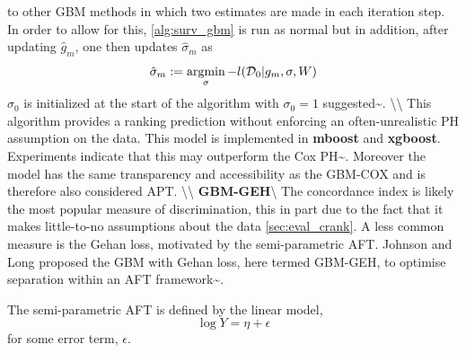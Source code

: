 \documentclass[
  letterpaper,
]{scrbook}
\theoremstyle{plain}
\theoremstyle{definition}
\theoremstyle{remark}
\begin{document}
to other GBM methods in which two estimates are made in each iteration
step. In order to allow for this, \ref{alg:surv_gbm} is run as normal
but in addition, after updating \(\hat{g}_m\), one then updates
\(\hat{\sigma}_m\) as \[
\hat{\sigma}_m := \operatornamewithlimits{argmin}_\sigma -l(\mathcal{D}_0|g_m,\sigma, W)
\] \(\sigma_0\) is initialized at the start of the algorithm with
\(\sigma_0 = 1\) suggested\textasciitilde{}\cite{Schmid2008b}.
\textbackslash\textbackslash{} This algorithm provides a ranking
prediction without enforcing an often-unrealistic PH assumption on the
data. This model is implemented in \textbf{mboost} and \textbf{xgboost}.
Experiments indicate that this may outperform the Cox
PH\textasciitilde{}\cite{Schmid2008b}. Moreover the model has the same
transparency and accessibility as the GBM-COX and is therefore also
considered APT. \textbackslash\textbackslash{}
\textbf{GBM-GEH}\label{mod:gbmgeh}\textbackslash{} The concordance index
is likely the most popular measure of discrimination, this in part due
to the fact that it makes little-to-no assumptions about the data
\ref{sec:eval_crank}. A less common measure is the Gehan loss, motivated
by the semi-parametric AFT. Johnson and Long proposed the GBM with Gehan
loss, here termed GBM-GEH, to optimise separation within an AFT
framework\textasciitilde{}\cite{Johnson2011}.

The semi-parametric AFT is defined by the linear model, \[
\log Y = \eta + \epsilon
\] for some error term, \(\epsilon\).
\end{document}
